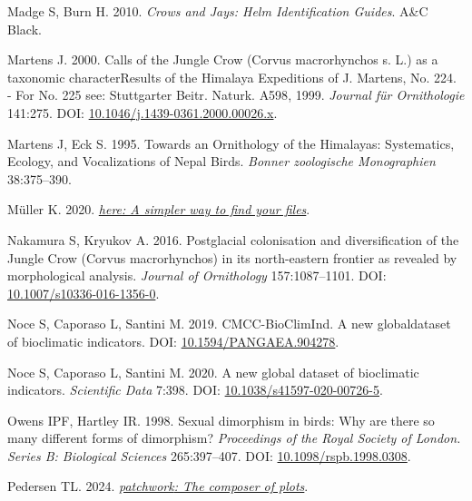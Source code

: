 \documentclass[10pt,a4paper]{article}
\newlength{\cslhangindent}
\newenvironment{CSLReferences}[2] %
 {\begin{list}{}{%
  \setlength{\itemindent}{0pt}
  \setlength{\leftmargin}{0pt}
  \setlength{\parsep}{0pt}
  \ifodd #1
   \setlength{\leftmargin}{\cslhangindent}
   \setlength{\itemindent}{-1\cslhangindent}
  \fi
  \setlength{\itemsep}{#2\baselineskip}}}
 {\end{list}}
\begin{document}
\begin{CSLReferences}{1}{0}
Madge S, Burn H. 2010. \emph{Crows and {Jays}: {Helm} {Identification} {Guides}}. A\&C Black.

Martens J. 2000. Calls of the {Jungle} {Crow} ({Corvus} macrorhynchos s. L.) as a taxonomic {characterResults} of the {Himalaya} {Expeditions} of {J}. {Martens}, {No}. 224. - {For} {No}. 225 see: {Stuttgarter} {Beitr}. {Naturk}. {A598}, 1999. \emph{Journal für Ornithologie} 141:275. DOI: \href{https://doi.org/10.1046/j.1439-0361.2000.00026.x}{10.1046/j.1439-0361.2000.00026.x}.

Martens J, Eck S. 1995. Towards an {Ornithology} of the {Himalayas}: {Systematics}, {Ecology}, and {Vocalizations} of {Nepal} {Birds}. \emph{Bonner zoologische Monographien} 38:375--390.

Müller K. 2020. \emph{\href{https://CRAN.R-project.org/package=here}{{here}: A simpler way to find your files}}.

Nakamura S, Kryukov A. 2016. Postglacial colonisation and diversification of the {Jungle} {Crow} ({Corvus} macrorhynchos) in its north-eastern frontier as revealed by morphological analysis. \emph{Journal of Ornithology} 157:1087--1101. DOI: \href{https://doi.org/10.1007/s10336-016-1356-0}{10.1007/s10336-016-1356-0}.

Noce S, Caporaso L, Santini M. 2019. {CMCC}-{BioClimInd}. {A} new globaldataset of bioclimatic indicators. DOI: \href{https://doi.org/10.1594/PANGAEA.904278}{10.1594/PANGAEA.904278}.

Noce S, Caporaso L, Santini M. 2020. A new global dataset of bioclimatic indicators. \emph{Scientific Data} 7:398. DOI: \href{https://doi.org/10.1038/s41597-020-00726-5}{10.1038/s41597-020-00726-5}.

Owens IPF, Hartley IR. 1998. Sexual dimorphism in birds: Why are there so many different forms of dimorphism? \emph{Proceedings of the Royal Society of London. Series B: Biological Sciences} 265:397--407. DOI: \href{https://doi.org/10.1098/rspb.1998.0308}{10.1098/rspb.1998.0308}.

Pedersen TL. 2024. \emph{\href{https://CRAN.R-project.org/package=patchwork}{{patchwork}: The composer of plots}}.


\end{CSLReferences}
\end{document}
